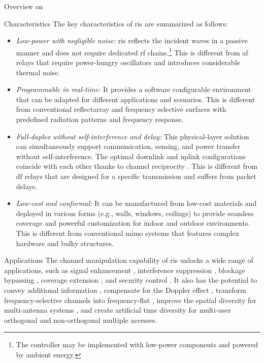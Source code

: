 \begin{section}{Overview on }
	\begin{subsection}{Characteristics}
		The key characteristics of \gls{ris} are summarized as follows:
		\begin{itemize}
			\item \emph{Low-power with negligible noise:} \gls{ris} reflects the incident waves in a passive manner and does not require dedicated \gls{rf} chains.\footnote{The controller may be implemented with low-power components and powered by ambient energy.} This is different from \gls{af} relays that require power-hungry oscillators and introduces considerable thermal noise.
			\item \emph{Programmable in real-time:} It provides a software configurable environment that can be adapted for different applications and scenarios. This is different from conventional reflectarray \cite{Nayeri2018} and frequency selective surfaces \cite{Anwar2018} with predefined radiation patterns and frequency response.
			\item \emph{Full-duplex without self-interference and delay:} This physical-layer solution can simultaneously support communication, sensing, and power transfer without self-interference. The optimal downlink and uplink configurations coincide with each other thanks to channel reciprocity \cite{Wu2021}. This is different from \gls{df} relays that are designed for a specific transmission and suffers from packet delays.
			\item \emph{Low-cost and conformal:} It can be manufactured from low-cost materials and deployed in various forms (e.g., walls, windows, ceilings) to provide seamless coverage and powerful customization for indoor and outdoor environments. This is different from conventional \gls{mimo} systems that features complex hardware and bulky structures.
		\end{itemize}
	\end{subsection}

	\begin{subsection}{Applications}\label{sc:ris_applications}
		The channel manipulation capability of \gls{ris} unlocks a wide range of applications, such as signal enhancement \cite{Wu2019}, interference suppression \cite{Jiang2022}, blockage bypassing \cite{Ghatak2021}, coverage extension \cite{Zeng2021}, and security control \cite{Almohamad2020}.
		It also has the potential to convey additional information \cite{Ye2022}, compensate for the Doppler effect \cite{Basar2021}, transform frequency-selective channels into frequency-flat \cite{Arslan2022}, improve the spatial diversity for multi-antenna systems \cite{Ozdogan2020a}, and create artificial time diversity for multi-user orthogonal \cite{Yang2019} and non-orthogonal \cite{Chen2023} multiple accesses.


\end{subsection}
\end{section}
